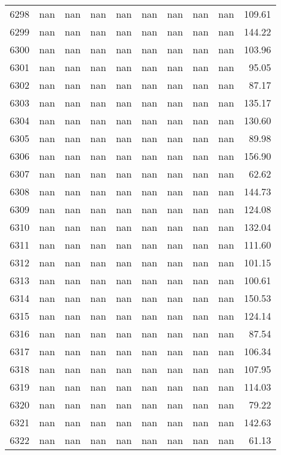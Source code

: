 \begin{tabular}{lrrrrrrrrr}
6298 & nan & nan & nan & nan & nan & nan & nan & nan & 109.61 \\
6299 & nan & nan & nan & nan & nan & nan & nan & nan & 144.22 \\
6300 & nan & nan & nan & nan & nan & nan & nan & nan & 103.96 \\
6301 & nan & nan & nan & nan & nan & nan & nan & nan & 95.05 \\
6302 & nan & nan & nan & nan & nan & nan & nan & nan & 87.17 \\
6303 & nan & nan & nan & nan & nan & nan & nan & nan & 135.17 \\
6304 & nan & nan & nan & nan & nan & nan & nan & nan & 130.60 \\
6305 & nan & nan & nan & nan & nan & nan & nan & nan & 89.98 \\
6306 & nan & nan & nan & nan & nan & nan & nan & nan & 156.90 \\
6307 & nan & nan & nan & nan & nan & nan & nan & nan & 62.62 \\
6308 & nan & nan & nan & nan & nan & nan & nan & nan & 144.73 \\
6309 & nan & nan & nan & nan & nan & nan & nan & nan & 124.08 \\
6310 & nan & nan & nan & nan & nan & nan & nan & nan & 132.04 \\
6311 & nan & nan & nan & nan & nan & nan & nan & nan & 111.60 \\
6312 & nan & nan & nan & nan & nan & nan & nan & nan & 101.15 \\
6313 & nan & nan & nan & nan & nan & nan & nan & nan & 100.61 \\
6314 & nan & nan & nan & nan & nan & nan & nan & nan & 150.53 \\
6315 & nan & nan & nan & nan & nan & nan & nan & nan & 124.14 \\
6316 & nan & nan & nan & nan & nan & nan & nan & nan & 87.54 \\
6317 & nan & nan & nan & nan & nan & nan & nan & nan & 106.34 \\
6318 & nan & nan & nan & nan & nan & nan & nan & nan & 107.95 \\
6319 & nan & nan & nan & nan & nan & nan & nan & nan & 114.03 \\
6320 & nan & nan & nan & nan & nan & nan & nan & nan & 79.22 \\
6321 & nan & nan & nan & nan & nan & nan & nan & nan & 142.63 \\
6322 & nan & nan & nan & nan & nan & nan & nan & nan & 61.13 \\

\end{tabular}
